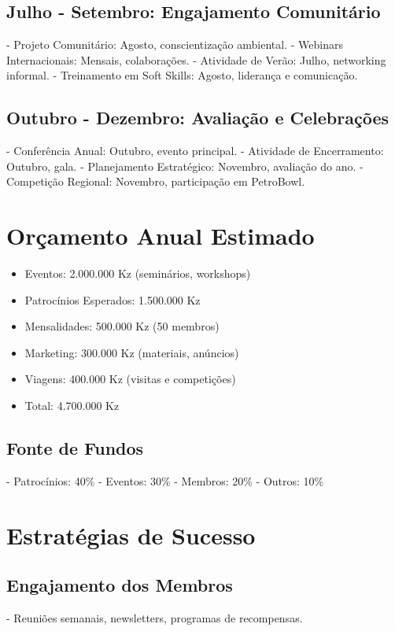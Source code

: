 \documentclass[12pt]{article}
\begin{document}
\subsection{Julho - Setembro: Engajamento Comunitário}
- Projeto Comunitário: Agosto, conscientização ambiental.
- Webinars Internacionais: Mensais, colaborações.
- Atividade de Verão: Julho, networking informal.
- Treinamento em Soft Skills: Agosto, liderança e comunicação.

\subsection{Outubro - Dezembro: Avaliação e Celebrações}
- Conferência Anual: Outubro, evento principal.
- Atividade de Encerramento: Outubro, gala.
- Planejamento Estratégico: Novembro, avaliação do ano.
- Competição Regional: Novembro, participação em PetroBowl.

\section{Orçamento Anual Estimado}

\begin{itemize}
    \item Eventos: 2.000.000 Kz (seminários, workshops)
    \item Patrocínios Esperados: 1.500.000 Kz
    \item Mensalidades: 500.000 Kz (50 membros)
    \item Marketing: 300.000 Kz (materiais, anúncios)
    \item Viagens: 400.000 Kz (visitas e competições)
    \item Total: 4.700.000 Kz
\end{itemize}

\subsection{Fonte de Fundos}
- Patrocínios: 40\%
- Eventos: 30\%
- Membros: 20\%
- Outros: 10\%

\section{Estratégias de Sucesso}

\subsection{Engajamento dos Membros}
- Reuniões semanais, newsletters, programas de recompensas.
\end{document}
